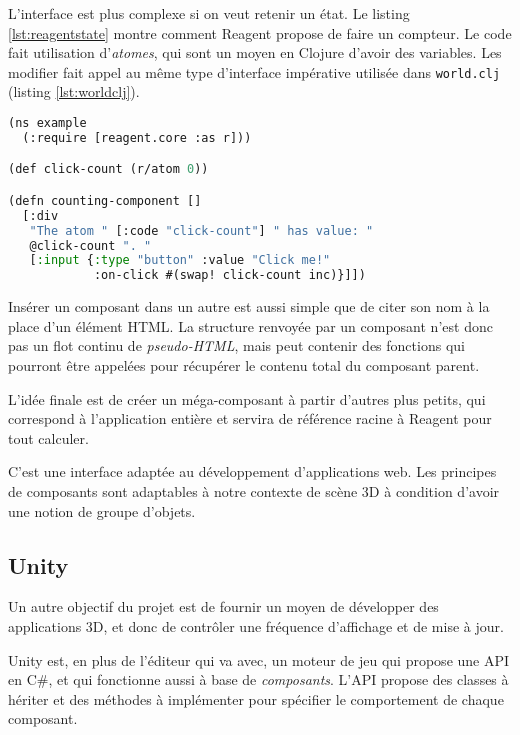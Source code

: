\documentclass{report}
\begin{document}
L'interface est plus complexe si on veut \og retenir un état.\fg{} Le listing
\ref{lst:reagentstate} montre comment Reagent propose de faire un compteur. Le
code fait utilisation d'\emph{atomes}, qui sont un moyen en Clojure d'avoir des
\og variables.\fg{} Les modifier fait appel au même type d'interface impérative
utilisée dans \texttt{world.clj} (listing \ref{lst:worldclj}).

\begin{lstlisting}[caption=Composant Reagent avec état,label={lst:reagentstate},language=Lisp]
(ns example
  (:require [reagent.core :as r]))

(def click-count (r/atom 0))

(defn counting-component []
  [:div
   "The atom " [:code "click-count"] " has value: "
   @click-count ". "
   [:input {:type "button" :value "Click me!"
            :on-click #(swap! click-count inc)}]])
\end{lstlisting}

Insérer un composant dans un autre est aussi simple que de citer son nom à la
place d'un élément HTML. La structure renvoyée par un composant n'est donc pas
un flot continu de \emph{pseudo-HTML}, mais peut contenir des fonctions qui
pourront être appelées pour récupérer le contenu total du composant parent.

L'idée finale est de créer un \og méga-composant\fg{} à partir d'autres plus
petits, qui correspond à l'application entière et servira de référence racine à
Reagent pour tout calculer.

C'est une interface adaptée au développement d'applications web. Les principes
de composants sont adaptables à notre contexte de scène 3D à condition d'avoir
une notion de \og groupe d'objets.\fg{}

\subsection{Unity}

Un autre objectif du projet est de fournir un moyen de développer des
applications 3D, et donc de contrôler une fréquence d'affichage et de mise à
jour.

Unity est, en plus de l'éditeur qui va avec, un moteur de jeu qui propose une
API en C\#, et qui fonctionne aussi à base de \emph{composants}. L'API propose
des classes à hériter et des méthodes à implémenter pour spécifier le
comportement de chaque composant.
\end{document}
